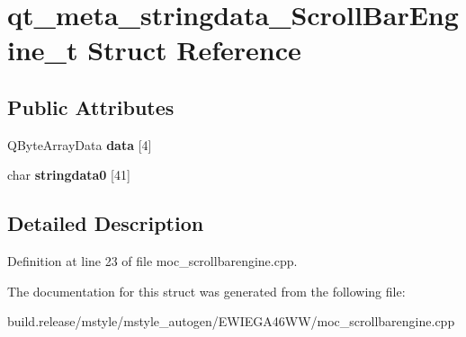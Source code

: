 \hypertarget{structqt__meta__stringdata___scroll_bar_engine__t}{}\section{qt\+\_\+meta\+\_\+stringdata\+\_\+\+Scroll\+Bar\+Engine\+\_\+t Struct Reference}
\label{structqt__meta__stringdata___scroll_bar_engine__t}
\subsection*{Public Attributes}
\begin{DoxyCompactItemize}
\item 
\mbox{\label{structqt__meta__stringdata___scroll_bar_engine__t_ac9e2b62559f8659322f2241da565f1ce}} 
Q\+Byte\+Array\+Data {\bfseries data} \mbox{[}4\mbox{]}
\item 
\mbox{\label{structqt__meta__stringdata___scroll_bar_engine__t_abe5a00e3371e0a4d12d7786843bfeec1}} 
char {\bfseries stringdata0} \mbox{[}41\mbox{]}
\end{DoxyCompactItemize}


\subsection{Detailed Description}


Definition at line 23 of file moc\+\_\+scrollbarengine.\+cpp.



The documentation for this struct was generated from the following file\+:\begin{DoxyCompactItemize}
\item 
build.\+release/mstyle/mstyle\+\_\+autogen/\+E\+W\+I\+E\+G\+A46\+W\+W/moc\+\_\+scrollbarengine.\+cpp\end{DoxyCompactItemize}
